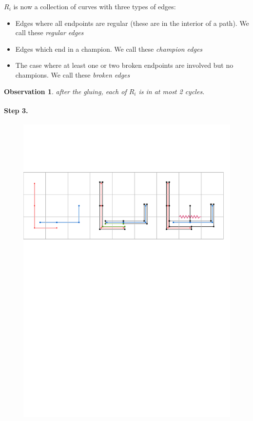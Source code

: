 \documentclass[a4paper,UKenglish,cleveref]{lipics-v2019}
\newtheorem{observation}{Observation}
\begin{document}
$R_i$ is now a collection of curves with three types of edges:

\begin{itemize}
\item Edges where all endpoints are regular (these are in the interior of a path). We call these \emph{regular edges}
\item Edges which end in a champion. We call these \emph{champion edges}
\item The case where at least one or two broken endpoints are involved but no champions. We call these \emph{broken edges}
\end{itemize}


\begin{observation}
after the gluing, each of $R_i$ is in at most 2 cycles.
\end{observation}
\paragraph*{Step 3.}

\begin{figure}[H]
\centering
\includegraphics[page = 2]{Figures/cycle.pdf}
\caption{ }
\label{fig:cycle2}
\end{figure}
\end{document}
